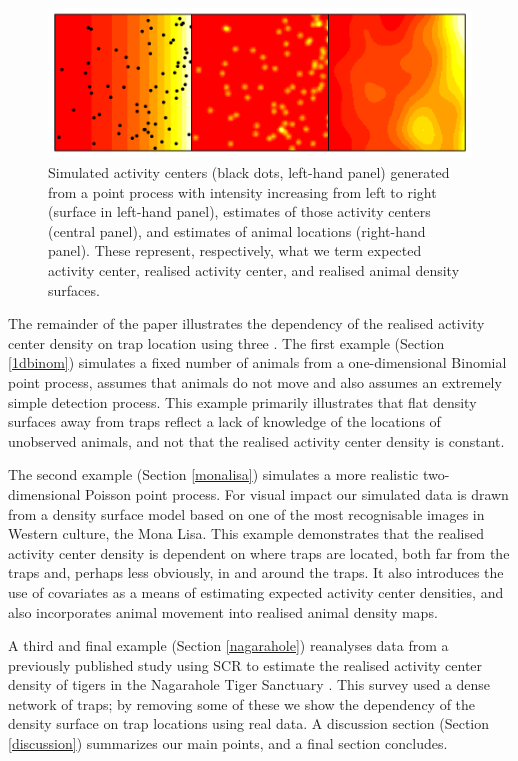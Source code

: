 \documentclass[a4paper,12pt]{article}
\begin{document}
\begin{figure}[htbp]
\centering
\includegraphics[width=\textwidth]{density-plots.pdf}
\caption{Simulated activity centers (black dots, left-hand panel) generated from a point process with intensity increasing from left to right (surface in left-hand panel), estimates of those activity centers (central panel), and estimates of animal locations (right-hand panel). These represent, respectively, what we term expected activity center, realised activity center, and realised animal density surfaces.}
\label{introplot}
\end{figure}

The remainder of the paper illustrates the dependency of the realised activity center density on trap location using three . The first example (Section \ref{1dbinom}) simulates a fixed number of animals from a one-dimensional Binomial point process, assumes that animals do not move and also assumes an extremely simple detection process. This example primarily illustrates that flat density surfaces away from traps reflect a lack of knowledge of the locations of unobserved animals, and not that the realised activity center density is constant.

The second example (Section \ref{monalisa}) simulates a more realistic two-dimensional Poisson point process. For visual impact our simulated data is drawn from a density surface model based on one of the most recognisable images in Western culture, the Mona Lisa. This example demonstrates that the realised activity center density is dependent on where traps are located, both far from the traps and, perhaps less obviously, in and around the traps. It also introduces the use of covariates as a means of estimating expected activity center densities, and also incorporates animal movement into realised animal density maps.  

A third and final example (Section \ref{nagarahole}) reanalyses data from a previously published study using SCR to estimate the realised activity center density of tigers in the Nagarahole Tiger Sanctuary \cite{?}. This survey used a dense network of traps; by removing some of these we show the dependency of the density surface on trap locations using real data. A discussion section (Section \ref{discussion}) summarizes our main points, and a final section concludes.
\end{document}
